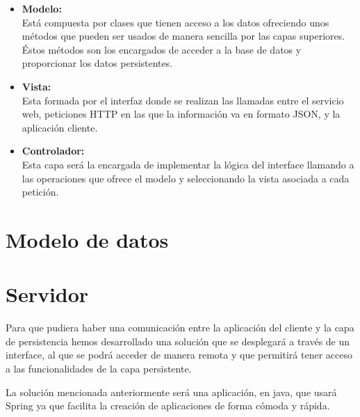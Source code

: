 \begin{itemize}
\item \textbf{Modelo:}\\
Está compuesta por clases que tienen acceso a los datos ofreciendo unos métodos que pueden ser usados de manera sencilla por las capas superiores. Éstos métodos son los encargados de acceder a la base de datos y proporcionar los datos persistentes.



\item \textbf{Vista:}\\

Esta formada por el interfaz donde se realizan las llamadas entre el servicio web, peticiones HTTP en las que la información va en formato JSON, y la aplicación cliente.

\item \textbf{Controlador:}\\
Esta capa será la encargada de implementar la lógica del interface llamando a las operaciones que ofrece el modelo y seleccionando la vista asociada a cada petición.



\end{itemize}


\section{Modelo de datos}

\section{Servidor}

Para que pudiera haber una comunicación entre la aplicación del cliente y la capa de persistencia hemos desarrollado una solución que se desplegará a través de un interface, al que se podrá acceder de manera remota y que permitirá tener acceso a las funcionalidades de la capa persistente.

La solución mencionada anteriormente será una aplicación, en java, que  usará Spring ya que facilita la creación de aplicaciones de forma cómoda y rápida.\\


